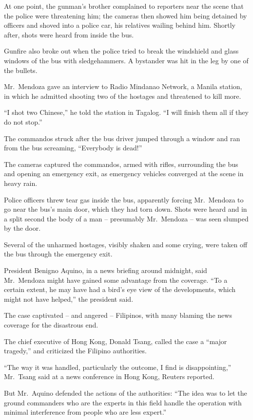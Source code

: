 ﻿\documentclass[12pt]{article}
\begin{document}
At one point, the gunman's brother complained to reporters near the scene that the police were
threatening him; the cameras then showed him being detained by officers and shoved into a police
car, his relatives wailing behind him. Shortly after, shots were heard from inside the bus.

Gunfire also broke out when the police tried to break the windshield and glass windows of the bus
with sledgehammers. A bystander was hit in the leg by one of the bullets.

Mr.~Mendoza gave an interview to Radio Mindanao Network, a Manila station, in which he admitted
shooting two of the hostages and threatened to kill more.

``I shot two Chinese,'' he told the station in Tagalog. ``I will finish them all if they do not
stop.''

The commandos struck after the bus driver jumped through a window and ran from the bus screaming,
``Everybody is dead!''

The cameras captured the commandos, armed with rifles, surrounding the bus and opening an emergency
exit, as emergency vehicles converged at the scene in heavy rain.

Police officers threw tear gas inside the bus, apparently forcing Mr.~Mendoza to go near the bus's
main door, which they had torn down. Shots were heard and in a split second the body of a man --
presumably Mr.~Mendoza -- was seen slumped by the door.

Several of the unharmed hostages, visibly shaken and some crying, were taken off the bus through the
emergency exit.

President Benigno Aquino, in a news briefing around midnight, said Mr.~Mendoza might have gained
some advantage from the coverage. ``To a certain extent, he may have had a bird's eye view of the
developments, which might not have helped,'' the president said.

The case captivated -- and angered -- Filipinos, with many blaming the news coverage for the
disastrous end.

The chief executive of Hong Kong, Donald Tsang, called the case a ``major tragedy,'' and criticized
the Filipino authorities.

``The way it was handled, particularly the outcome, I find is disappointing,'' Mr.~Tsang said at a
news conference in Hong Kong, Reuters reported.

But Mr.~Aquino defended the actions of the authorities: ``The idea was to let the ground commanders
who are the experts in this field handle the operation with minimal interference from people who are
less expert.''
\end{document}
